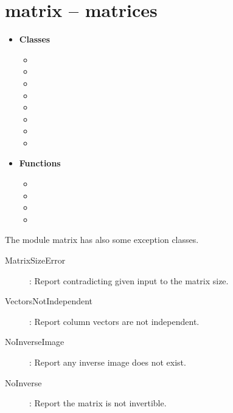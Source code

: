 

 \section{matrix -- matrices}
 \begin{itemize}
   \item {\bf Classes}
   \begin{itemize}
     \item {}
     \item {}
     \item {}
     \item {}
     \item {}
     \item {}
     \item {}
     \item {}
   \end{itemize}
   \item {\bf Functions}
     \begin{itemize}
       \item {}
       \item {}
       \item {}
       \item {}
     \end{itemize}
 \end{itemize}
 
 The module matrix has also some exception classes.
 \begin{description}
   \item[MatrixSizeError]:
     Report contradicting given input to the matrix size.
   \item[VectorsNotIndependent]:
     Report column vectors are not independent. 
   \item[NoInverseImage]:
     Report any inverse image does not exist.
   \item[NoInverse]:
     Report the matrix is not invertible.
 \end{description}

